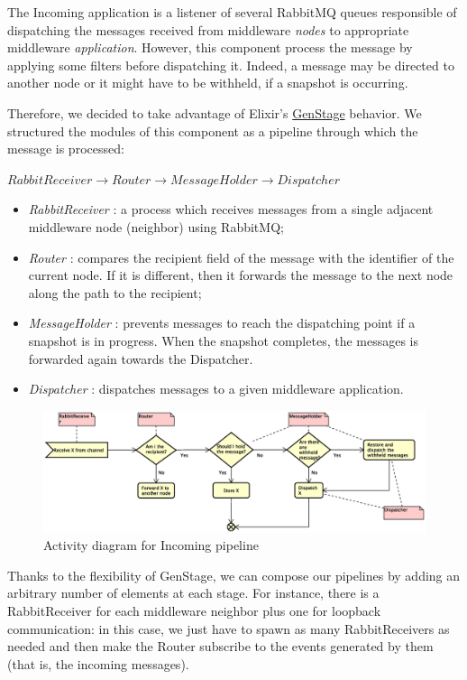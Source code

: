 The Incoming application is a listener of several RabbitMQ queues
responsible of dispatching the messages received
from middleware \textit{nodes} to appropriate middleware \textit{application}.
However, this component process the message by applying some
filters before dispatching it.
Indeed, a message may be directed to another node or it might have to
be withheld, if a snapshot is occurring.

Therefore, we decided to take advantage of Elixir's
\href{https://hexdocs.pm/gen_stage/GenStage.html}{GenStage} behavior.
We structured the modules of this component as a pipeline through which the
message is processed:
\begin{center}
$ RabbitReceiver \longrightarrow Router \longrightarrow
MessageHolder \longrightarrow Dispatcher $
\end{center}

\begin{itemize}
  \item \textit{RabbitReceiver} : a process which receives messages from a single
    adjacent middleware node (neighbor) using RabbitMQ;
  \item \textit{Router} : compares the recipient field of the message with the
    identifier of the current node. If it is different, then it forwards the
    message to the next node along the path to the recipient;
  \item \textit{MessageHolder} : prevents messages to reach the dispatching
    point if a
    snapshot is in progress. When the snapshot completes,
    the messages is
    forwarded again towards the Dispatcher.
  \item \textit{Dispatcher} : dispatches messages to a
  given middleware application.
\end{itemize}

\begin{figure}[H]
  \centering
  \includegraphics[width=\columnwidth]{images/solution/mw/inc/activity.eps}
  \caption{Activity diagram for Incoming pipeline}
  \label{fig:mw-incoming-activity}
\end{figure}

Thanks to the flexibility of GenStage, we can compose our pipelines by adding
an arbitrary number of elements at each stage. For instance,
there is a RabbitReceiver for each middleware neighbor plus one for loopback
communication: in this case, we just have to spawn as many RabbitReceivers as
needed and then make the Router subscribe to the events generated by them
(that is, the incoming messages).
